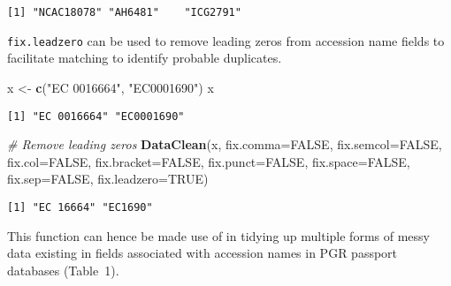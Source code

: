 \documentclass[
]{article}
\newenvironment{Shaded}{\begin{snugshade}}{\end{snugshade}}
\newcommand{\CommentTok}[1]{\textcolor[rgb]{0.56,0.35,0.01}{\textit{#1}}}
\newcommand{\DataTypeTok}[1]{\textcolor[rgb]{0.13,0.29,0.53}{#1}}
\newcommand{\KeywordTok}[1]{\textcolor[rgb]{0.13,0.29,0.53}{\textbf{#1}}}
\newcommand{\NormalTok}[1]{#1}
\newcommand{\OtherTok}[1]{\textcolor[rgb]{0.56,0.35,0.01}{#1}}
\newcommand{\StringTok}[1]{\textcolor[rgb]{0.31,0.60,0.02}{#1}}
\begin{document}
\begin{verbatim}
[1] "NCAC18078" "AH6481"    "ICG2791"  
\end{verbatim}

\texttt{fix.leadzero} can be used to remove leading zeros from accession
name fields to facilitate matching to identify probable duplicates.

\begin{Shaded}
\begin{Highlighting}[]
\NormalTok{x <-}\StringTok{ }\KeywordTok{c}\NormalTok{(}\StringTok{"EC 0016664"}\NormalTok{, }\StringTok{"EC0001690"}\NormalTok{)}
\NormalTok{x}
\end{Highlighting}
\end{Shaded}

\begin{verbatim}
[1] "EC 0016664" "EC0001690" 
\end{verbatim}

\begin{Shaded}
\begin{Highlighting}[]
\CommentTok{# Remove leading zeros}
\KeywordTok{DataClean}\NormalTok{(x, }\DataTypeTok{fix.comma=}\OtherTok{FALSE}\NormalTok{, }\DataTypeTok{fix.semcol=}\OtherTok{FALSE}\NormalTok{, }\DataTypeTok{fix.col=}\OtherTok{FALSE}\NormalTok{,}
          \DataTypeTok{fix.bracket=}\OtherTok{FALSE}\NormalTok{, }\DataTypeTok{fix.punct=}\OtherTok{FALSE}\NormalTok{, }\DataTypeTok{fix.space=}\OtherTok{FALSE}\NormalTok{, }\DataTypeTok{fix.sep=}\OtherTok{FALSE}\NormalTok{,}
          \DataTypeTok{fix.leadzero=}\OtherTok{TRUE}\NormalTok{)}
\end{Highlighting}
\end{Shaded}

\begin{verbatim}
[1] "EC 16664" "EC1690"  
\end{verbatim}

This function can hence be made use of in tidying up multiple forms of
messy data existing in fields associated with accession names in PGR
passport databases (Table~1).

\begin{Shaded}
\end{Shaded}
\end{document}
